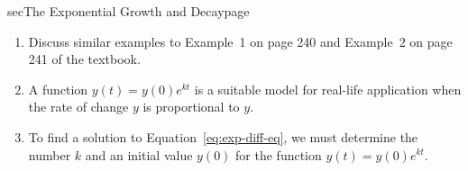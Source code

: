\documentclass[../main]{subfiles}
\begin{document}
\begin{outline}{sec}{The Exponential Growth and Decay}{page}
\begin{enumerate}
    \item Discuss similar examples to Example~1 on page 240 and Example~2 on page 241 of the textbook.
    \item {A function \(y(t) = y(0) e^{kt}\) is a suitable model for real-life application when the rate of change \(y\) is proportional to \(y\).}
    \item {To find a solution to Equation~\eqref{eq:exp-diff-eq}, we must determine the number \(k\) and an initial value \(y(0)\) for the function \(y(t) = y(0) e^{kt}\). }
\end{enumerate}
\end{outline}
\end{document}
